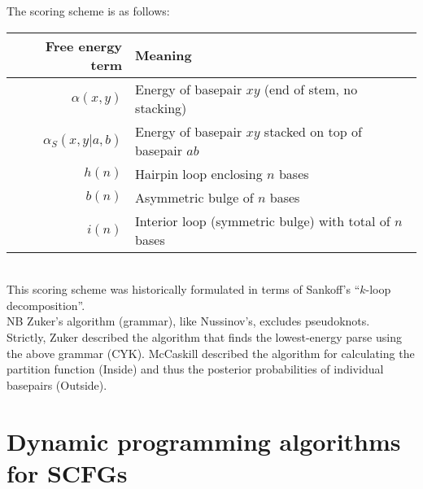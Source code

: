 \documentclass{beamer}
\begin{document}
\begin{frame}{}
The scoring scheme is as follows:
\\
\small
\begin{tabular}{rl}
Free energy term & Meaning \\
\hline
$\alpha(x,y)$ & Energy of basepair $xy$ (end of stem, no stacking) \\
$\alpha_S(x,y|a,b)$ & Energy of basepair $xy$ stacked on top of basepair $ab$ \\
$h(n)$ & Hairpin loop enclosing $n$ bases \\
$b(n)$ & Asymmetric bulge of $n$ bases \\
$i(n)$ & Interior loop (symmetric bulge) with total of $n$ bases
\end{tabular}
\normalsize
\\
This scoring scheme was historically formulated in terms of Sankoff's ``$k$-loop decomposition''.
\\
NB Zuker's algorithm (grammar), like Nussinov's, excludes pseudoknots.
\\
Strictly, Zuker described the algorithm that finds the lowest-energy parse using the above grammar (CYK).
McCaskill described the algorithm for calculating the partition function (Inside)
and thus the posterior probabilities of individual basepairs (Outside).

\end{frame}

\section{Dynamic programming algorithms for SCFGs}
\end{document}
